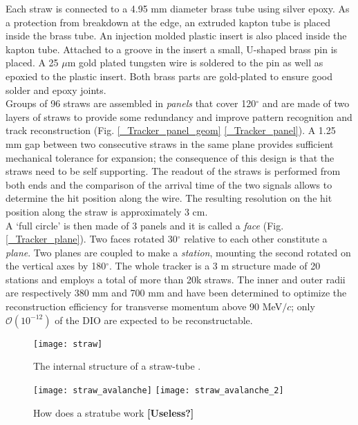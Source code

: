 \documentclass[12pt,a4paper,openright, oneside, titlepage]{book} %
\begin{document}
\noindent
Each straw is connected to a 4.95 mm diameter brass tube using silver epoxy.
As a protection from breakdown at the edge, an extruded kapton tube is placed inside the brass tube. An injection molded plastic insert is also placed inside the kapton tube. Attached to a groove in the insert a small, U-shaped brass pin is placed. A 25 $\mu$m gold plated tungsten wire is soldered to the pin as well as epoxied to the plastic insert. Both brass parts are gold-plated to ensure good solder and epoxy joints.  \\
Groups of 96 straws are assembled in \textit{panels} that cover 120$^\circ$ and are made of two layers of straws 
to provide some redundancy and improve pattern recognition and track reconstruction
(Fig. \ref{_Tracker_panel_geom} \ref{_Tracker_panel}).
 A 1.25 mm gap between two consecutive straws in the same plane 
 provides sufficient mechanical tolerance for expansion; 
 the consequence of this design is that the straws need to be self supporting. 
 The readout of the straws is performed from both ends and the comparison 
 of the arrival time of the two signals allows to determine the hit position along the wire. 
 The resulting resolution on the hit position along the straw is approximately 3 cm. \\
A `full circle' is then made of 3 panels and it is called a \textit{face} (Fig. \ref{_Tracker_plane}). 
Two faces rotated  30$^\circ$ relative to each other constitute a \textit{plane}. 
Two planes are coupled to make a \textit{station}, mounting the second rotated on the vertical axes by 180$^\circ$. 
The whole tracker is a 3 m structure made of 20 stations  and employs a total of more than 20k straws. 
The inner and outer radii are respectively 380 mm and 700 mm and have been determined 
to optimize the reconstruction efficiency for transverse momentum above 90 MeV$/c$; only $\mathcal{O}(10^{-12})$ of the DIO are expected to be reconstructable\cite{Manolis}. \\

\begin{figure}[h!]
\centering
\texttt{[image: straw]}
\caption{The internal structure of a straw-tube \cite{MTDR}.}
\label{_straw}
\end{figure}

\begin{figure}[h!]
\centering
\texttt{[image: straw\_avalanche]}
\texttt{[image: straw\_avalanche\_2]}
\caption{How does a stratube work \cite{MultiwireDrift} \textbf{[Useless?]}}
\label{_straw_avalanche}
\end{figure}
\end{document}
